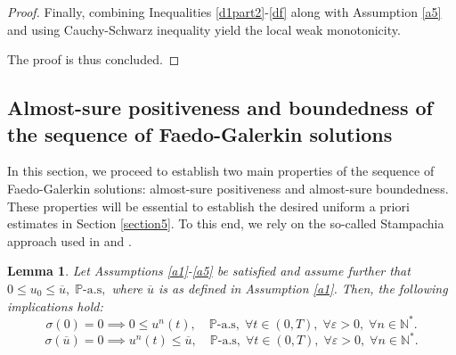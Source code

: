 \documentclass[10pt,number,preprint,times]{elsarticle}
\numberwithin{equation}{section} %
\newtheorem{lem}{Lemma}[section]
\begin{document}
\begin{proof}
\noindent
Finally, combining Inequalities \eqref{d1part2}-\eqref{df} along with Assumption \ref{a5} and using Cauchy-Schwarz inequality yield the local weak monotonicity.

The proof is thus concluded.
\end{proof}
\subsection{Almost-sure positiveness and boundedness of the sequence of Faedo-Galerkin solutions}
In this section, we proceed to establish two main properties of the sequence of Faedo-Galerkin solutions: almost-sure positiveness and almost-sure boundedness. These properties will be essential to establish the desired uniform a priori estimates in Section \ref{section5}. To this end, we rely on the so-called Stampachia approach used in \cite{chekroun2016stampacchia} and \cite{bendahmane2022martingale}.
\begin{lem}\label{lemmaa}
	Let Assumptions \ref{a1}-\ref{a5} be satisfied and assume further that $0 \leq u_0 \leq \overline{u},\; \mathbb{P}\text{-a.s},$ where $\overline{u}$ is as defined in Assumption \ref{a1}. Then, the following implications hold:
\begin{equation}\label{firstimpli}
\sigma(0)=0 \implies 0 \leq u^n(t), \quad \mathbb{P}\text{-a.s}, \; \forall t \in (0,T),\; \forall \varepsilon>0,\; \forall n \in \mathbb{N}^*.
\end{equation}
\begin{equation}\label{sécoondéimpli}
\sigma(\overline{u})=0 	\implies u^n(t) \leq \overline{u}, \quad \mathbb{P}\text{-a.s}, \; \forall t \in (0,T),\; \forall \varepsilon>0,\; \forall n \in \mathbb{N}^*.
\end{equation}
\end{lem}
\end{document}
